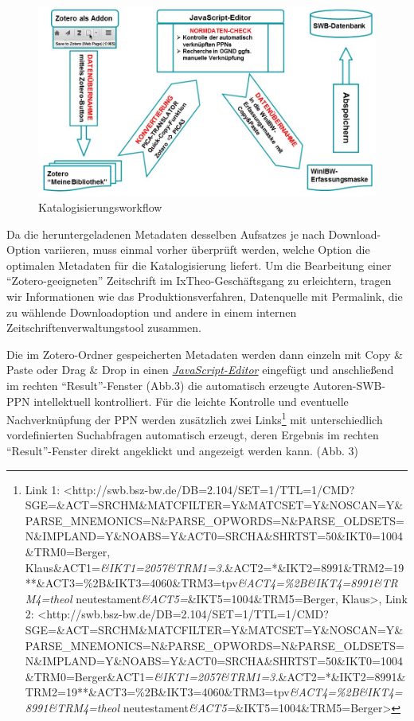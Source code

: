 \documentclass[a4paper,
fontsize=11pt,
oneside,
numbers=noperiodatend,
parskip=half-,
bibliography=totoc,
final
]{scrartcl}
\begin{document}
\begin{figure}[htbp]
\centering
\includegraphics{img/Workflow.jpg}
\caption{Katalogisierungsworkflow}
\end{figure}

Da die heruntergeladenen Metadaten desselben Aufsatzes je nach
Download-Option variieren, muss einmal vorher überprüft werden, welche
Option die optimalen Metadaten für die Katalogisierung liefert. Um die
Bearbeitung einer \enquote{Zotero-geeigneten} Zeitschrift im
IxTheo-Geschäftsgang zu erleichtern, tragen wir Informationen wie das
Produktionsverfahren, Datenquelle mit Permalink, die zu wählende
Downloadoption und andere in einem internen Zeitschriftenverwaltungstool
zusammen.

Die im Zotero-Ordner gespeicherten Metadaten werden dann einzeln mit
Copy \& Paste oder Drag \& Drop in einen
\href{http://www.w3schools.com/js/tryit.asp?filename=tryjs_myfirst}{\emph{JavaScript-Editor}}
eingefügt und anschließend im rechten \enquote{Result}-Fenster (Abb.3)
die automatisch erzeugte Autoren-SWB-PPN intellektuell kontrolliert. Für
die leichte Kontrolle und eventuelle Nachverknüpfung der PPN werden
zusätzlich zwei Links\footnote{Link 1:
  \textless{}http://swb.bsz-bw.de/DB=2.104/SET=1/TTL=1/CMD?SGE=\&ACT=SRCHM\&MATCFILTER=Y\&MATCSET=Y\&NOSCAN=Y\&PARSE\_MNEMONICS=N\&PARSE\_OPWORDS=N\&PARSE\_OLDSETS=N\&IMPLAND=Y\&NOABS=Y\&ACT0=SRCHA\&SHRTST=50\&IKT0=1004\&TRM0=Berger,
  Klaus\&ACT1=\emph{\&IKT1=2057\&TRM1=3.}\&ACT2=*\&IKT2=8991\&TRM2=19**\&ACT3=\%2B\&IKT3=4060\&TRM3=tpv\emph{\&ACT4=\%2B\&IKT4=8991\&TRM4=theol}
  neutestament\emph{\&ACT5=}\&IKT5=1004\&TRM5=Berger,
  Klaus\textgreater{}, Link 2:
  \textless{}http://swb.bsz-bw.de/DB=2.104/SET=1/TTL=1/CMD?SGE=\&ACT=SRCHM\&MATCFILTER=Y\&MATCSET=Y\&NOSCAN=Y\&PARSE\_MNEMONICS=N\&PARSE\_OPWORDS=N\&PARSE\_OLDSETS=N\&IMPLAND=Y\&NOABS=Y\&ACT0=SRCHA\&SHRTST=50\&IKT0=1004\&TRM0=Berger\&ACT1=\emph{\&IKT1=2057\&TRM1=3.}\&ACT2=*\&IKT2=8991\&TRM2=19**\&ACT3=\%2B\&IKT3=4060\&TRM3=tpv\emph{\&ACT4=\%2B\&IKT4=8991\&TRM4=theol}
  neutestament\emph{\&ACT5=}\&IKT5=1004\&TRM5=Berger\textgreater{}} mit
unterschiedlich vordefinierten Suchabfragen automatisch erzeugt, deren
Ergebnis im rechten \enquote{Result}-Fenster direkt angeklickt und
angezeigt werden kann. (Abb. 3)
\end{document}
